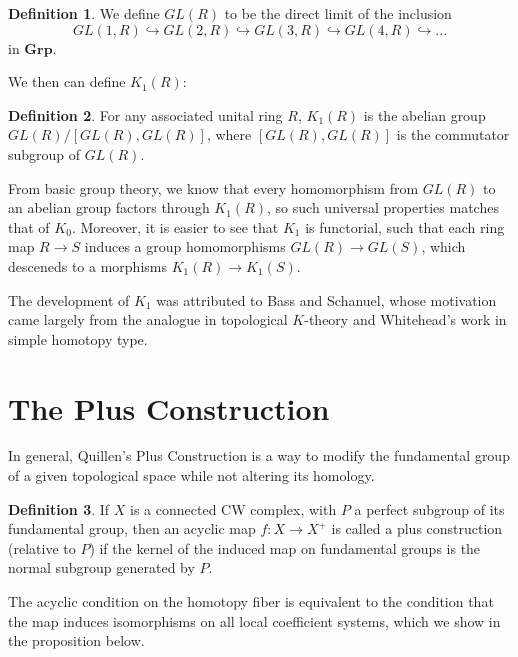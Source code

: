 \documentclass{article}
\theoremstyle{definition}
\theoremstyle{definition}
\newtheorem{definition}{Definition}[theorem]
\theoremstyle{definition}
\theoremstyle{definition}
\theoremstyle{definition}
\theoremstyle{definition}
\theoremstyle{definition}
\begin{document}
\begin{tcolorbox}[colback=purple!5!white,colframe=purple!75!black]
\begin{definition}
    We define $GL(R)$ to be the direct limit of the inclusion
    \[
GL(1,R)\hookrightarrow GL(2,R)\hookrightarrow GL(3,R)\hookrightarrow GL(4,R)\hookrightarrow ...
\] in $\textbf{Grp}$.
\end{definition}
\end{tcolorbox}

We then can define $K_1(R)$:

\begin{tcolorbox}[colback=purple!5!white,colframe=purple!75!black]
\begin{definition}
    For any associated unital ring $R$, $K_1(R)$ is the abelian group $GL(R)/[GL(R),GL(R)]$, where $[GL(R),GL(R)]$ is the commutator subgroup of $GL(R)$. 
\end{definition}
\end{tcolorbox}
From basic group theory, we know that every homomorphism from $GL(R)$ to an abelian group factors through $K_1(R)$, so such universal properties matches that of $K_0$. Moreover, it is easier to see that $K_1$ is functorial, such that each ring map $R\xrightarrow{}S$ induces a group homomorphisms $GL(R)\xrightarrow{}GL(S)$, which desceneds to a morphisms $K_1(R)\xrightarrow{}K_1(S)$.

The development of $K_1$ was attributed to Bass and Schanuel, whose motivation came largely from the analogue in topological $K$-theory and Whitehead's work in simple homotopy type.

\section{The Plus Construction}
In general, Quillen's Plus Construction is a way to modify the fundamental group of a given topological space while not altering its homology. 

\begin{tcolorbox}[colback=purple!5!white,colframe=purple!75!black]
\begin{definition}
    If $X$ is a connected CW complex, with $P$ a perfect subgroup of its fundamental group, then an acyclic map $f:X\xrightarrow{}X^{+}$ is called a plus construction (relative to $P$) if the kernel of the induced map on fundamental groups is the normal subgroup generated by $P$. 
\end{definition}
\end{tcolorbox}
The acyclic condition on the homotopy fiber is equivalent to the condition that the map induces isomorphisms on all local coefficient systems, which we show in the proposition below. 
\end{document}
